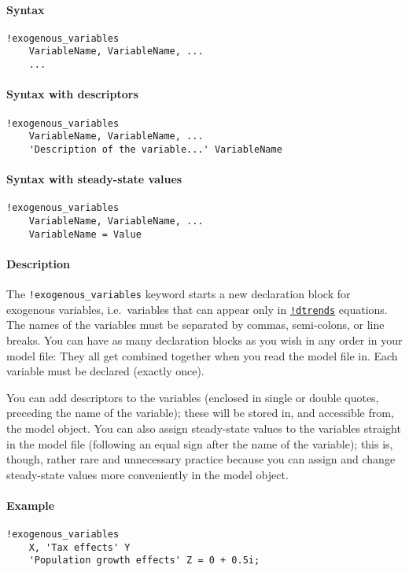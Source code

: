 


	\paragraph{Syntax}

\begin{verbatim}
!exogenous_variables
    VariableName, VariableName, ...
    ...
\end{verbatim}

\paragraph{Syntax with descriptors}

\begin{verbatim}
!exogenous_variables
    VariableName, VariableName, ...
    'Description of the variable...' VariableName
\end{verbatim}

\paragraph{Syntax with steady-state
values}

\begin{verbatim}
!exogenous_variables
    VariableName, VariableName, ...
    VariableName = Value
\end{verbatim}

\paragraph{Description}

The \texttt{!exogenous\_variables} keyword starts a new declaration
block for exogenous variables, i.e.~variables that can appear only in
\href{modellang/dtrends}{\texttt{!dtrends}} equations. The names of the
variables must be separated by commas, semi-colons, or line breaks. You
can have as many declaration blocks as you wish in any order in your
model file: They all get combined together when you read the model file
in. Each variable must be declared (exactly once).

You can add descriptors to the variables (enclosed in single or double
quotes, preceding the name of the variable); these will be stored in,
and accessible from, the model object. You can also assign steady-state
values to the variables straight in the model file (following an equal
sign after the name of the variable); this is, though, rather rare and
unnecessary practice because you can assign and change steady-state
values more conveniently in the model object.

\paragraph{Example}

\begin{verbatim}
!exogenous_variables
    X, 'Tax effects' Y
    'Population growth effects' Z = 0 + 0.5i;
\end{verbatim}


